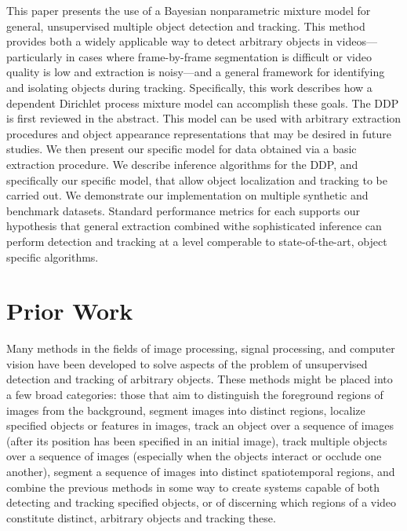 \documentclass[twocolumn, final]{svjour3}
\begin{document}
This paper presents the use of a Bayesian nonparametric mixture model for general, unsupervised multiple object detection and tracking. This method provides both a widely applicable way to detect arbitrary objects in videos---particularly in cases where frame-by-frame segmentation is difficult or video quality is low and extraction is noisy---and a general framework for identifying and isolating objects during tracking. Specifically, this work describes how a dependent Dirichlet process mixture model can accomplish these goals. The DDP is first reviewed in the abstract. This model can be used with arbitrary extraction procedures and object appearance representations that may be desired in future studies. We then present our specific model for data obtained via a basic extraction procedure. We describe inference algorithms for the DDP, and specifically our specific model, that allow object localization and tracking to be carried out. We demonstrate our implementation on multiple synthetic and benchmark datasets. Standard performance metrics for each supports our hypothesis that general extraction combined withe sophisticated inference can perform detection and tracking at a level comperable to state-of-the-art, object specific algorithms.




\section{Prior Work}
\label{sec:priorwork}

Many methods in the fields of image processing, signal processing, and computer vision have been developed to solve aspects of the problem of unsupervised detection and tracking of arbitrary objects. These methods might be placed into a few broad categories: those that aim to distinguish the foreground regions of images from the background, segment images into distinct regions, localize specified objects or features in images, track an object over a sequence of images (after its position has been specified in an initial image), track multiple objects over a sequence of images (especially when the objects interact or occlude one another), segment a sequence of images into distinct spatiotemporal regions, and combine the previous methods in some way to create systems capable of both detecting and tracking specified objects, or of discerning which regions of a video constitute distinct, arbitrary objects and tracking these.
\end{document}
